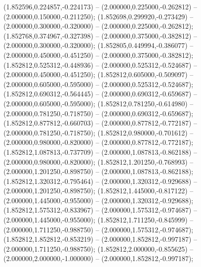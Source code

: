  (1.852596,0.224857,-0.224173) -- (2.000000,0.225000,-0.262812) -- (2.000000,0.150000,-0.211250);
 (1.852698,0.299920,-0.273429) -- (2.000000,0.300000,-0.320000) -- (2.000000,0.225000,-0.262812);
 (1.852768,0.374967,-0.327398) -- (2.000000,0.375000,-0.382812) -- (2.000000,0.300000,-0.320000);
 (1.852805,0.449994,-0.386077) -- (2.000000,0.450000,-0.451250) -- (2.000000,0.375000,-0.382812);
 (1.852812,0.525312,-0.448936) -- (2.000000,0.525312,-0.524687) -- (2.000000,0.450000,-0.451250);
 (1.852812,0.605000,-0.509097) -- (2.000000,0.605000,-0.595000) -- (2.000000,0.525312,-0.524687);
 (1.852812,0.690312,-0.564445) -- (2.000000,0.690312,-0.659687) -- (2.000000,0.605000,-0.595000);
 (1.852812,0.781250,-0.614980) -- (2.000000,0.781250,-0.718750) -- (2.000000,0.690312,-0.659687);
 (1.852812,0.877812,-0.660703) -- (2.000000,0.877812,-0.772187) -- (2.000000,0.781250,-0.718750);
 (1.852812,0.980000,-0.701612) -- (2.000000,0.980000,-0.820000) -- (2.000000,0.877812,-0.772187);
 (1.852812,1.087813,-0.737709) -- (2.000000,1.087813,-0.862188) -- (2.000000,0.980000,-0.820000);
 (1.852812,1.201250,-0.768993) -- (2.000000,1.201250,-0.898750) -- (2.000000,1.087813,-0.862188);
 (1.852812,1.320312,-0.795464) -- (2.000000,1.320312,-0.929688) -- (2.000000,1.201250,-0.898750);
 (1.852812,1.445000,-0.817122) -- (2.000000,1.445000,-0.955000) -- (2.000000,1.320312,-0.929688);
 (1.852812,1.575312,-0.833967) -- (2.000000,1.575312,-0.974687) -- (2.000000,1.445000,-0.955000);
 (1.852812,1.711250,-0.845999) -- (2.000000,1.711250,-0.988750) -- (2.000000,1.575312,-0.974687);
 (1.852812,1.852812,-0.853219) -- (2.000000,1.852812,-0.997187) -- (2.000000,1.711250,-0.988750);
 (1.852812,2.000000,-0.855625) -- (2.000000,2.000000,-1.000000) -- (2.000000,1.852812,-0.997187);
